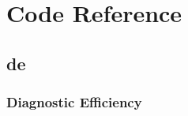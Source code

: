\documentclass[letterpaper,10pt,english]{sphinxmanual}
\begin{document}
\section{Code Reference}
\label{\detokenize{reference/reference:code-reference}}\label{\detokenize{reference/reference::doc}}

\subsection{de}
\label{\detokenize{reference/de:de}}\label{\detokenize{reference/de::doc}}

\subsubsection{Diagnostic Efficiency}
\label{\detokenize{reference/de:diagnostic-efficiency}}
\end{document}
